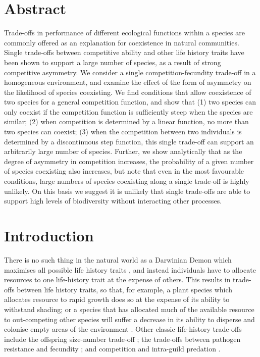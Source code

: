 \newpage
{}
\vspace*{\fill}
\section*{Abstract}
Trade-offs in performance of different ecological functions within a species are  commonly offered as an explanation for coexistence in natural communities. Single trade-offs between competitive ability and other life history traits have been shown to support a large number of species, as a result of strong competitive asymmetry. We consider a single competition-fecundity trade-off in a homogeneous environment, and examine the effect of the form of asymmetry on the likelihood of species coexisting. We find conditions that allow coexistence of two species for a general competition function, and show that (1) two species can only coexist if the competition function is sufficiently steep when the species are similar; (2) when competition is determined by a linear function, no more than two species can coexist; (3) when the competition between two individuals is determined by a discontinuous step function, this single trade-off can support an arbitrarily large number of species. Further, we show analytically that as the degree of asymmetry in competition increases, the probability of a given number of species coexisting also increases, but note that even in the most favourable conditions, large numbers of species coexisting along a single trade-off is highly unlikely. On this basis we suggest it is unlikely that single trade-offs are able to support high levels of biodiversity without interacting other processes.
\vspace*{\fill}
\newpage

\section{Introduction}


There is no such thing in the natural world as a Darwinian Demon which maximises all possible life history traits \citep{law1979optimal}, and instead individuals have to allocate resources to one life-history trait at the expense of others. This results in trade-offs between life history traits, so that, for example, a plant species which allocates resource to rapid growth does so at the expense of its ability to withstand shading; or a species that has allocated much of the available resource to out-competing other species will suffer a decrease in its ability to disperse and colonise empty areas of the environment  \citep[e.g.][]{tilman1994competition, cadotte2006testing}. Other classic life-history trade-offs include the offspring size-number trade-off \citep[e.g.][]{venable1992size}; the trade-offs between pathogen resistance and fecundity \citep[e.g.][]{bowers1994life}; and competition and intra-guild predation \citep{amarasekare2007trade}.

